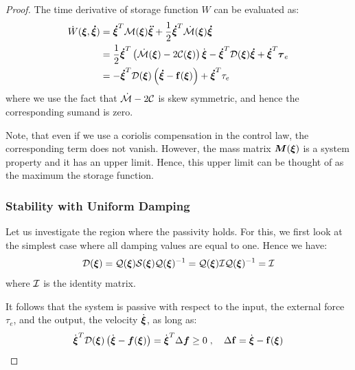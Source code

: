 \begin{proof}
The time derivative of storage function $W$ can be evaluated as:
\begin{align}
    \dot W(\boldsymbol{\xi}, \boldsymbol{\dot \xi}) &=
    \boldsymbol{\dot \xi}^T \mathcal{M}(\boldsymbol{\xi}) \boldsymbol{\ddot \xi}  + \frac{1}{2} \boldsymbol{\dot \xi}^T \dot{\mathcal{M}}(\boldsymbol{\xi}) \boldsymbol{\dot \xi}  \nonumber \\
  &= \frac{1}{2} \boldsymbol{\dot \xi}^T \left( \dot{\mathcal{M}}(\boldsymbol{\xi}) - 2 \mathcal{C}(\boldsymbol{\xi}) \right) \dot{\boldsymbol{\xi}} - \boldsymbol{\dot \xi}^T \mathcal{D}(\boldsymbol{\xi}) \boldsymbol{\dot \xi} + \boldsymbol{\dot \xi}^T \boldsymbol{\tau}_e \nonumber \\
  &= - \boldsymbol{\dot \xi}^T \mathcal{D}(\boldsymbol{\xi}) \left( \boldsymbol{\dot\xi} - \mathbf{f}(\boldsymbol{\xi}) \right) + \boldsymbol{\dot\xi}^T \tau_e
\end{align}
where we use the fact that $\dot{\mathcal{M}} - 2 \mathcal{C}$ is skew symmetric, and hence the corresponding sumand is zero.

Note, that even if we use a coriolis compensation in the control law, the corresponding term does not vanish. However, the mass matrix $\boldsymbol{M}(\boldsymbol{\xi})$ is a system property and it has an upper limit. Hence, this upper limit can be thought of as the maximum the storage function.

\subsubsection{Stability with Uniform Damping}
Let us investigate the region where the passivity holds. For this, we first look at the simplest case where all damping values are equal to one. Hence we have:
\begin{equation}
	\mathcal{D}({\boldsymbol{\xi}}) = \mathcal{Q}({\boldsymbol{\xi}}) \mathcal{S} ({\boldsymbol{\xi}}) \mathcal{Q}({\boldsymbol{\xi}})^{-1}= \mathcal{Q}({\boldsymbol{\xi}}) \mathcal{I} \mathcal{Q}({\boldsymbol{\xi}})^{-1} = \mathcal{I}
\end{equation}
where $\mathcal{I}$ is the identity matrix.

It follows that the system is passive with respect to the input, the external force $\tau_e$, and the output, the velocity $\dot {\boldsymbol{\xi}}$, as long as:
\begin{equation}
	\dot{\boldsymbol {\boldsymbol{\xi}}}^T \mathcal{D}({\boldsymbol{\xi}}) \left(\dot{\boldsymbol {\boldsymbol{\xi}}} - \boldsymbol{f}(\boldsymbol {\boldsymbol{\xi}}) \right) = 
    \dot{{\boldsymbol{\xi}}} ^ T \Delta \boldsymbol{f}  \geq 0 
 \; , \quad
 \Delta \mathbf{f} = \dot{{\boldsymbol{\xi}}} - \mathbf{f}({\boldsymbol{\xi}})
\end{equation}


\end{proof}
